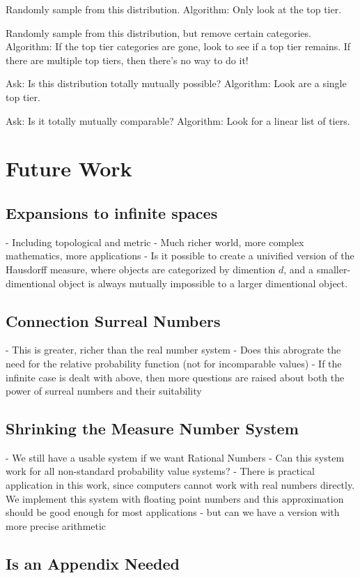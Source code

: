 \documentclass[twoside]{article}
\begin{document}
Randomly sample from this distribution. Algorithm: Only look at the top tier.

Randomly sample from this distribution, but remove certain categories. Algorithm: If the top tier categories are gone, look to see if a top tier remains. If there are multiple top tiers, then there's no way to do it!

Ask: Is this distribution totally mutually possible? Algorithm: Look are a single top tier.

Ask: Is it totally mutually comparable? Algorithm: Look for a linear list of tiers.

\section{Future Work}
\subsection{Expansions to infinite spaces}
- Including topological and metric
- Much richer world, more complex mathematics, more applications
- Is it possible to create a univified version of the Hausdorff measure, where objects are categorized by dimention \(d\), and a smaller-dimentional object is always mutually impossible to a larger dimentional object.
\subsection{Connection Surreal Numbers}
- This is greater, richer than the real number system
- Does this abrograte the need for the relative probability function (not for incomparable values)
- If the infinite case is dealt with above, then more questions are raised about both the power of surreal numbers and their suitability
\subsection{Shrinking the Measure Number System}
- We still have a usable system if we want Rational Numbers
- Can this system work for all non-standard probability value systems?
- There is practical application in this work, since computers cannot work with real numbers directly. We implement this system with floating point numbers and this approximation should be good enough for most applications - but can we have a version with more precise arithmetic

\begin{appendices}

\section{Is an Appendix Needed}

\end{appendices}
\end{document}
